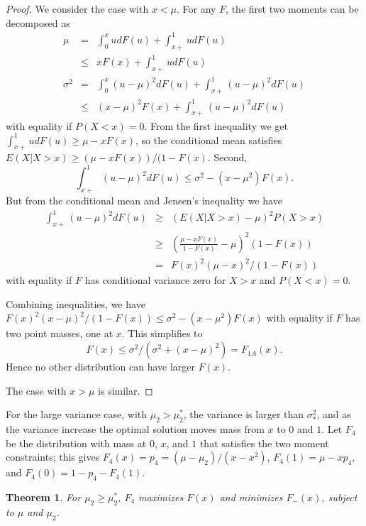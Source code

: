 \documentclass{article}
\newtheorem{theorem}{Theorem}
\begin{document}
\begin{proof}
We consider the case with $x < \mu$.
For any $F$, the first two moments can be decomposed as
\begin{eqnarray}
  \mu &=& \int_0^x u dF(u) + \int_{x+}^1 u dF(u) \nonumber \\
      &\le& x F(x) + \int_{x+}^1 u dF(u) \nonumber \\
  \sigma^2 &=& \int_0^x (u-\mu)^2 dF(u) + \int_{x+}^1 (u-\mu)^2 dF(u) \nonumber\\
       &\le& (x-\mu)^2 F(x) + \int_{x+}^1 (u-\mu)^2 dF(u) \nonumber
\end{eqnarray}
with equality if $P(X < x) = 0$.
From the first inequality we get
$\int_{x+}^1 u dF(u) \ge \mu - x F(x)$, so
the conditional mean satisfies $E(X | X > x) \ge (\mu - x F(x))/(1-F(x)$.
Second,
$$\int_{x+}^1 (u-\mu)^2 dF(u) \le \sigma^2 - (x-\mu^2) F(x).$$
But from the conditional mean and Jensen's inequality we have
\begin{eqnarray}
  \int_{x+}^1 (u-\mu)^2 dF(u)
  &\ge& (E(X | X > x) - \mu)^2P(X > x) \nonumber \\
  &\ge& \left( \frac{\mu-x F(x)}{1-F(x)} - \mu\right)^2 (1-F(x)) \nonumber \\
  &=& F(x)^2 (\mu-x)^2 / (1-F(x)) \nonumber
\end{eqnarray}
with equality
if $F$ has conditional variance zero for $X > x$ and $P(X < x) = 0$.

Combining inequalities, we have
$F(x)^2 (x-\mu)^2 / (1-F(x)) \le \sigma^2 - (x-\mu^2) F(x)$
with equality if $F$ has two point masses, one at $x$.
This simplifies to
$$ F(x) \le \sigma^2 / (\sigma^2 + (x - \mu)^2) = F_{1A}(x).$$
Hence no other distribution can have larger $F(x)$.

The case with $x > \mu$ is similar.
\end{proof}

For the large variance case,
with $\mu_2 > \mu_2^*$,
the variance is larger than $\sigma_*^2$,
and as the variance increase
the optimal solution moves mass
from $x$ to $0$ and $1$.
Let $F_4$ be the distribution with mass at $0$, $x$, and $1$ that
satisfies the two moment constraints; this gives
$F_4(x) = p_4 = (\mu-\mu_2)/(x-x^2)$,
$F_4(1) = \mu - x p_4$, and
$F_4(0) = 1 - p_4 - F_4(1)$.

\begin{theorem}
For $\mu_2 \ge \mu_2^*$,
$F_4$ maximizes $F(x)$ and minimizes $F_{-}(x)$, subject to $\mu$
and $\mu_2$.
\end{theorem}
\end{document}
